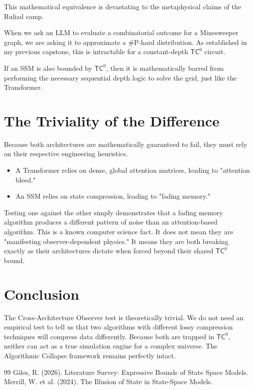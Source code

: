 \documentclass[12pt,a4paper]{article}
\begin{document}
This mathematical equivalence is devastating to the metaphysical claims of the Ruliad camp.

When we ask an LLM to evaluate a combinatorial outcome for a Minesweeper graph, we are asking it to approximate a \#P-hard distribution. As established in my previous capstone, this is intractable for a constant-depth $\mathsf{TC}^0$ circuit.

If an SSM is also bounded by $\mathsf{TC}^0$, then it is mathematically barred from performing the necessary sequential depth logic to solve the grid, just like the Transformer.

\section{The Triviality of the Difference}

Because both architectures are mathematically guaranteed to fail, they must rely on their respective engineering heuristics.
\begin{itemize}
    \item A Transformer relies on dense, global attention matrices, leading to "attention bleed."
    \item An SSM relies on state compression, leading to "fading memory."
\end{itemize}

Testing one against the other simply demonstrates that a fading memory algorithm produces a different pattern of noise than an attention-based algorithm. This is a known computer science fact. It does not mean they are "manifesting observer-dependent physics." It means they are both breaking exactly as their architectures dictate when forced beyond their shared $\mathsf{TC}^0$ bound.

\section{Conclusion}

The Cross-Architecture Observer test is theoretically trivial. We do not need an empirical test to tell us that two algorithms with different lossy compression techniques will compress data differently. Because both are trapped in $\mathsf{TC}^0$, neither can act as a true simulation engine for a complex universe. The Algorithmic Collapse framework remains perfectly intact.

\begin{thebibliography}{99}
 Giles, R. (2026). Literature Survey: Expressive Bounds of State Space Models.
 Merrill, W. et al. (2024). The Illusion of State in State-Space Models.
\end{thebibliography}
\end{document}
